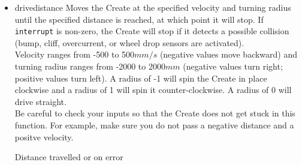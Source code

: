\documentclass {article}
\begin{document}
\begin {itemize}
\item {} {drivedistance} Moves the Create at the
  specified velocity and turning radius until the specified distance
  is reached, at which point it will stop. If {\tt interrupt} is
  non-zero, the Create will stop if it detects a possible collision
  (bump, cliff, overcurrent, or wheel
  drop sensors are activated). \\
  Velocity ranges from -500 to 500$mm/s$ (negative values move
  backward) and turning radius ranges from -2000 to 2000$mm$ (negative
  values turn right; positive values turn left).  A radius of -1 will
  spin the Create in place clockwise and a radius of 1 will spin it
  counter-clockwise.  A radius of 0 will drive straight. \\
  Be careful to check your inputs so that the Create does not get
  stuck in this function.  For
  example, make sure you do not pass a negative distance and a positve velocity. \\
  \ret Distance travelled or \fail on error


\end{itemize}
\end{document}
